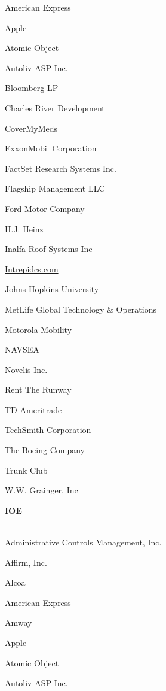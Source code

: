 \documentclass[twoside]{article}
\begin{document}
\begin{center}
\begin{multicols}{5}
\begin{FlushLeft}
\begin{compactitem}
\item American Express
\item Apple
\item Atomic Object
\item Autoliv ASP Inc.
\item Bloomberg LP
\item Charles River Development
\item CoverMyMeds
\item ExxonMobil Corporation
\item FactSet Research Systems Inc.
\item Flagship Management LLC
\item Ford Motor Company
\item H.J. Heinz
\item Inalfa Roof Systems Inc
\item \url{Intrepidcs.com}
\item Johns Hopkins University
\item MetLife Global Technology \& Operations
\item Motorola Mobility
\item NAVSEA
\item Novelis Inc.
\item Rent The Runway
\item TD Ameritrade
\item TechSmith Corporation
\item The Boeing Company
\item Trunk Club
\item W.W. Grainger, Inc
\end{compactitem}
        \end{FlushLeft}
        \vspace{1em}
        {\fontsize{14}{16}\selectfont \bf IOE}\\
        \vspace{-1em}
        ~\hrulefill~
        \vspace{-.9em}
        \begin{FlushLeft}
        \begin{compactitem}
        \item Administrative Controls Management, Inc.
\item Affirm, Inc.
\item Alcoa
\item American Express
\item Amway
\item Apple
\item Atomic Object
\item Autoliv ASP Inc.

\end{compactitem}
\end{FlushLeft}
\end{multicols}
\end{center}
\end{document}
